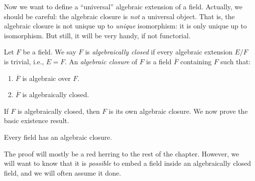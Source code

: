 \noindent
Now we want to define a ``universal'' algebraic extension of a field.
Actually, we should be careful: the algebraic closure is {\it not} a
universal object. That is, the algebraic closure is not unique up to
{\it unique} isomorphism: it is only unique up to isomorphism. But still,
it will be very handy, if not functorial.

\begin{definition}
\label{definition-algebraic-closure}
Let $F$ be a field. We say $F$ is {\it algebraically closed} if every
algebraic extension $E/F$ is trivial, i.e., $E = F$. An {\it algebraic closure}
of $F$ is a field $\overline{F}$ containing $F$ such that:
\begin{enumerate}
\item $\overline{F}$ is algebraic over $F$.
\item $\overline{F}$ is algebraically closed.
\end{enumerate}
\end{definition}

\noindent
If $F$ is algebraically closed, then $F$ is its own algebraic closure.
We now prove the basic existence result.

\begin{theorem}
\label{theorem-existence-algebraic-closure}
Every field has an algebraic closure.
\end{theorem}

\noindent
The proof will mostly be a red herring to the rest of the chapter. However, we
will want to know that it is {\it possible} to embed a field inside an
algebraically closed field, and we will often assume it done.

